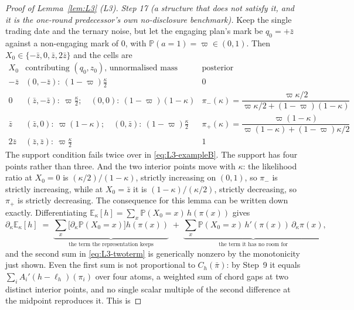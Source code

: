 \documentclass[11pt]{article}
\newcommand{\Eop}{\mathbb{E}}
\newcommand{\Prb}{\mathbb{P}}
\begin{document}
\begin{proof}[Proof of Lemma~\ref{lem:L3} (L3)]
\emph{Step 17 (a structure that does not satisfy it, and it is the one-round predecessor's own
no-disclosure benchmark).} Keep
the single trading date and the ternary noise, but let the engaging plan's mark be $q_0 = +\bar z$
against a non-engaging mark of $0$, with $\Prb(a=1) = \varpi \in (0,1)$. Then
$X_0 \in \{-\bar z,0,\bar z,2\bar z\}$ and the cells are
\begin{equation}
\label{eq:L3-exampleB}
\begin{array}{c|l|c}
X_0 & \text{contributing } (q_0,z_0)\text{, unnormalised mass} & \text{posterior}\\
\hline
-\bar z & (0,-\bar z):\ (1-\varpi)\tfrac{\kappa}{2}
  & 0\\
0 & (\bar z,-\bar z):\ \varpi\tfrac{\kappa}{2};\quad (0,0):\ (1-\varpi)(1-\kappa)
  & \pi_-(\kappa) = \dfrac{\varpi\kappa/2}{\varpi\kappa/2+(1-\varpi)(1-\kappa)}\\
\bar z & (\bar z,0):\ \varpi(1-\kappa);\quad (0,\bar z):\ (1-\varpi)\tfrac{\kappa}{2}
  & \pi_+(\kappa) = \dfrac{\varpi(1-\kappa)}{\varpi(1-\kappa)+(1-\varpi)\kappa/2}\\
2\bar z & (\bar z,\bar z):\ \varpi\tfrac{\kappa}{2}
  & 1
\end{array}
\end{equation}
The support condition fails twice over in \eqref{eq:L3-exampleB}. The support has four points rather
than three. And the two interior points move with $\kappa$: the likelihood ratio at $X_0 = 0$ is
$(\kappa/2)/(1-\kappa)$, strictly increasing on $(0,1)$, so $\pi_-$ is strictly increasing, while at
$X_0 = \bar z$ it is $(1-\kappa)/(\kappa/2)$, strictly decreasing, so $\pi_+$ is strictly decreasing.
The consequence for this lemma can be written down exactly. Differentiating
$\Eop_\kappa[h] = \sum_x \Prb(X_0=x)\,h(\pi(x))$ gives
\begin{equation}
\label{eq:L3-twoterm}
\partial_\kappa \Eop_\kappa[h]
 \;=\; \underbrace{\sum_x \bigl[\partial_\kappa\Prb(X_0=x)\bigr]h(\pi(x))}_{\text{the term the
   representation keeps}}
 \;+\; \underbrace{\sum_x \Prb(X_0=x)\,h'(\pi(x))\,\partial_\kappa\pi(x)}_{\text{the term it has no
   room for}},
\end{equation}
and the second sum in \eqref{eq:L3-twoterm} is generically nonzero by the monotonicity just shown.
Even the first sum is not proportional to $C_h(\bar\pi)$: by Step~9 it equals
$\sum_i A_i'(h-\ell_h)(\pi_i)$ over four atoms, a weighted sum of chord gaps at two distinct interior
points, and no single scalar multiple of the second difference at the midpoint reproduces it. This is

\end{proof}
\end{document}
